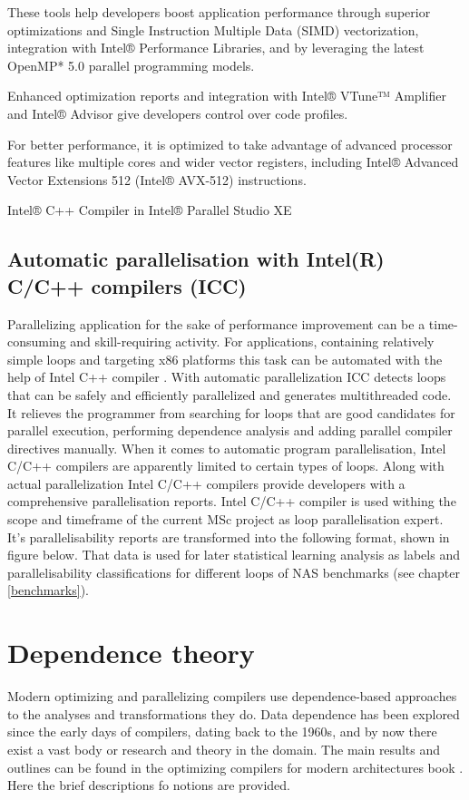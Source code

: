 These tools help developers boost application performance through superior optimizations and Single Instruction Multiple Data (SIMD) vectorization, integration with Intel® Performance Libraries, and by leveraging the latest OpenMP* 5.0 parallel programming models.

Enhanced optimization reports and integration with Intel® VTune™ Amplifier and Intel® Advisor give developers control over code profiles.

For better performance, it is optimized to take advantage of advanced processor features like multiple cores and wider vector registers, including Intel® Advanced Vector Extensions 512 (Intel® AVX-512) instructions. 

Intel® C++ Compiler in Intel® Parallel Studio XE

\subsection{Automatic parallelisation with Intel(R) C/C++ compilers (ICC)}
\qquad Parallelizing application for the sake of performance improvement can be a time-consuming and skill-requiring activity. For applications, containing relatively simple loops and targeting x86 platforms this task can be automated with the help of Intel C++ compiler \cite{intel-multithreading-guide}. With automatic parallelization ICC detects loops that can be safely and efficiently parallelized and generates multithreaded code. It relieves the programmer from searching for loops that are good candidates for parallel execution, performing dependence analysis and adding parallel compiler directives manually. \newline \null\qquad When it comes to automatic program parallelisation, Intel C/C++ compilers are apparently limited to certain types of loops. \newline \null\qquad Along with actual parallelization Intel C/C++ compilers provide developers with a comprehensive parallelisation reports. \newline \null\qquad Intel C/C++ compiler is used withing the scope and timeframe of the current MSc project as loop parallelisation expert. It's parallelisability reports are transformed into the following format, shown in figure below. That data is used for later statistical learning analysis as labels and parallelisability classifications for different loops of NAS benchmarks (see chapter \ref{benchmarks}).      
   

\section{Dependence theory} \label{background-dependence-theory}
\qquad Modern optimizing and parallelizing compilers use dependence-based approaches to the analyses and transformations they do. Data dependence has been explored since the early days of compilers, dating back to the 1960s, and by now there exist a vast body or research and theory in the domain. The main results and outlines can be found in the optimizing compilers for modern architectures book \cite{optimizing-compilers-book}. Here the brief descriptions fo notions are provided.  
